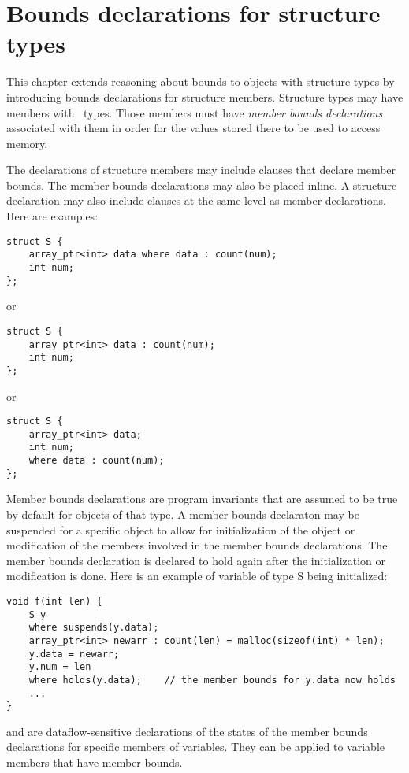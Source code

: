 
\chapter{Bounds declarations for structure types}
\label{chapter:structure-bounds}

This chapter extends reasoning about bounds to objects with structure
types by introducing bounds declarations for structure members.
Structure types may have members with \arrayptr\ types. Those
members must have \emph{member bounds declarations} associated with them in order for
the values stored there to be used to access memory.

The declarations of
structure members may include  clauses that declare member
bounds. The member bounds declarations may also be placed inline.
A structure declaration may also include  clauses at the same
level as member declarations.  Here are examples:

\begin{lstlisting}
struct S {
    array_ptr<int> data where data : count(num);
    int num;
};
\end{lstlisting}
or
\begin{lstlisting}
struct S {
    array_ptr<int> data : count(num);
    int num;
};
\end{lstlisting}
or
\begin{lstlisting}
struct S {
    array_ptr<int> data;
    int num;
    where data : count(num);
};
\end{lstlisting}

Member bounds declarations are program invariants that are assumed to be true
by default for objects of that type. A member bounds declaraton may be suspended for a specific
object to allow for initialization of the object or modification of the
members involved in the member bounds declarations. The member bounds
declaration is declared to hold again after the initialization or modification is done.
Here is an example of variable of type S being initialized:

\begin{lstlisting}
void f(int len) {
    S y 
    where suspends(y.data);
    array_ptr<int> newarr : count(len) = malloc(sizeof(int) * len);
    y.data = newarr;
    y.num = len
    where holds(y.data);    // the member bounds for y.data now holds
    ...
}
\end{lstlisting}

 and  are dataflow-sensitive declarations of 
the states of the member bounds declarations for specific members of variables. They can be
applied to variable members that have member bounds.

